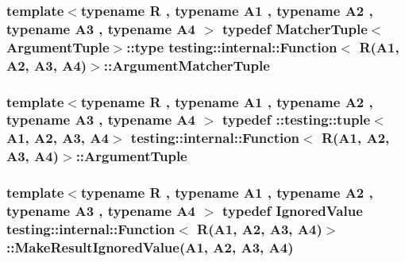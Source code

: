 \subsubsection[{\texorpdfstring{Argument\+Matcher\+Tuple}{ArgumentMatcherTuple}}]{\setlength{\rightskip}{0pt plus 5cm}template$<$typename R , typename A1 , typename A2 , typename A3 , typename A4 $>$ typedef {\bf Matcher\+Tuple}$<${\bf Argument\+Tuple}$>$\+::type {\bf testing\+::internal\+::\+Function}$<$ R(A1, A2, A3, A4)$>$\+::{\bf Argument\+Matcher\+Tuple}}\hypertarget{structtesting_1_1internal_1_1Function_3_01R_07A1_00_01A2_00_01A3_00_01A4_08_4_a9524b18868ab632a90d4cb6917057a14}{}\label{structtesting_1_1internal_1_1Function_3_01R_07A1_00_01A2_00_01A3_00_01A4_08_4_a9524b18868ab632a90d4cb6917057a14}
\subsubsection[{\texorpdfstring{Argument\+Tuple}{ArgumentTuple}}]{\setlength{\rightskip}{0pt plus 5cm}template$<$typename R , typename A1 , typename A2 , typename A3 , typename A4 $>$ typedef \+::testing\+::tuple$<$A1, A2, A3, A4$>$ {\bf testing\+::internal\+::\+Function}$<$ R(A1, A2, A3, A4)$>$\+::{\bf Argument\+Tuple}}\hypertarget{structtesting_1_1internal_1_1Function_3_01R_07A1_00_01A2_00_01A3_00_01A4_08_4_a8ad9e0ae57a766f80a9816ad45626812}{}\label{structtesting_1_1internal_1_1Function_3_01R_07A1_00_01A2_00_01A3_00_01A4_08_4_a8ad9e0ae57a766f80a9816ad45626812}
\subsubsection[{\texorpdfstring{Make\+Result\+Ignored\+Value}{MakeResultIgnoredValue}}]{\setlength{\rightskip}{0pt plus 5cm}template$<$typename R , typename A1 , typename A2 , typename A3 , typename A4 $>$ typedef {\bf Ignored\+Value} {\bf testing\+::internal\+::\+Function}$<$ R(A1, A2, A3, A4)$>$\+::Make\+Result\+Ignored\+Value(A1, A2, A3, A4)}\hypertarget{structtesting_1_1internal_1_1Function_3_01R_07A1_00_01A2_00_01A3_00_01A4_08_4_a6736086d1c8ba25788add1e5180207f9}{}\label{structtesting_1_1internal_1_1Function_3_01R_07A1_00_01A2_00_01A3_00_01A4_08_4_a6736086d1c8ba25788add1e5180207f9}
